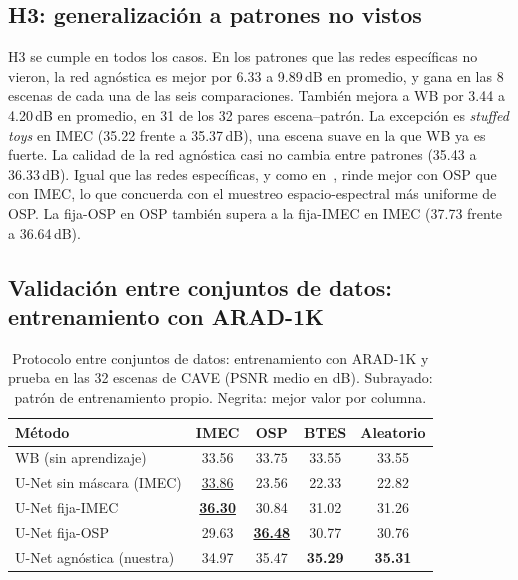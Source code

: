 \documentclass{article}
\newcommand{\seen}[1]{\underline{#1}}
\begin{document}
\subsection{H3: generalización a patrones no vistos}

H3 se cumple en todos los casos. En los patrones que las redes específicas
no vieron, la red agnóstica es mejor por 6.33 a 9.89\,dB en promedio, y gana
en las 8 escenas de cada una de las seis comparaciones. También mejora a WB
por 3.44 a 4.20\,dB en promedio, en 31 de los 32 pares escena--patrón. La
excepción es \textit{stuffed toys} en IMEC (35.22 frente a 35.37\,dB), una
escena suave en la que WB ya es fuerte. La calidad de la red agnóstica casi
no cambia entre patrones (35.43 a 36.33\,dB). Igual que las redes
específicas, y como en~\cite{diaz2023}, rinde mejor con OSP que con IMEC, lo
que concuerda con el muestreo espacio-espectral más uniforme de OSP. La
fija-OSP en OSP también supera a la fija-IMEC en IMEC (37.73 frente a
36.64\,dB).

\subsection{Validación entre conjuntos de datos: entrenamiento con ARAD-1K}
\label{sec:cross}

\begin{table}[t]
\centering
\caption{Protocolo entre conjuntos de datos: entrenamiento con ARAD-1K y
prueba en las 32 escenas de CAVE (PSNR medio en dB). Subrayado: patrón de
entrenamiento propio. Negrita: mejor valor por columna.}
\label{tab:arad}
\footnotesize
\setlength{\tabcolsep}{3.5pt}
\begin{tabular}{|l|c|c|c|c|}
\hline
Método & IMEC & OSP & BTES & Aleatorio \\
\hline
WB (sin aprendizaje)      & 33.56 & 33.75 & 33.55 & 33.55 \\
U-Net sin máscara (IMEC)  & \seen{33.86} & 23.56 & 22.33 & 22.82 \\
U-Net fija-IMEC           & \seen{\textbf{36.30}} & 30.84 & 31.02 & 31.26 \\
U-Net fija-OSP            & 29.63 & \seen{\textbf{36.48}} & 30.77 & 30.76 \\
U-Net agnóstica (nuestra) & 34.97 & 35.47 & \textbf{35.29} & \textbf{35.31} \\
\hline
\end{tabular}
\end{table}
\end{document}
